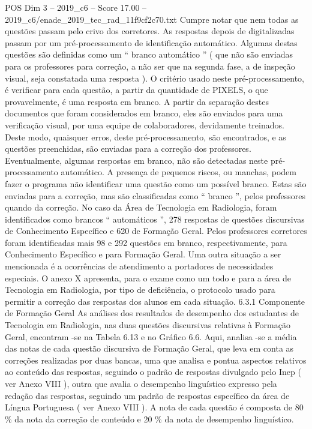 \begin{textsample}{POS Dim 3 – 2019\_c6 – Score 17.00 – 2019\_c6/enade\_2019\_tec\_rad\_11f9cf2c70.txt}
Cumpre notar que nem todas as questões passam pelo crivo dos corretores.
As respostas depois de digitalizadas passam por um pré-processamento de identificação automático.
Algumas destas questões são definidas como um “ branco automático ” ( que não são enviadas para os professores para correção, a não ser que na segunda fase, a de inspeção visual, seja constatada uma resposta ).
O critério usado neste pré-processamento, é verificar para cada questão, a partir da quantidade de PIXELS, o que provavelmente, é uma resposta em branco.
A partir da separação destes documentos que foram considerados em branco, eles são enviados para uma verificação visual, por uma equipe de colaboradores, devidamente treinados.
Deste modo, quaisquer erros, deste pré-processamento, são encontrados, e as questões preenchidas, são enviadas para a correção dos professores.
Eventualmente, algumas respostas em branco, não são detectadas neste pré-processamento automático.
A presença de pequenos riscos, ou manchas, podem fazer o programa não identificar uma questão como um possível branco.
Estas são enviadas para a correção, mas são classificadas como “ branco ”, pelos professores quando da correção.
No caso da Área de Tecnologia em Radiologia, foram identificados como brancos “ automáticos ”, 278 respostas de questões discursivas de Conhecimento Específico e 620 de Formação Geral.
Pelos professores corretores foram identificadas mais 98 e 292 questões em branco, respectivamente, para Conhecimento Específico e para Formação Geral.
Uma outra situação a ser mencionada é a ocorrências de atendimento a portadores de necessidades especiais.
O anexo X apresenta, para o exame como um todo e para a área de Tecnologia em Radiologia, por tipo de deficiência, o protocolo usado para permitir a correção das respostas dos alunos em cada situação. 6.3.1 Componente de Formação Geral As análises dos resultados de desempenho dos estudantes de Tecnologia em Radiologia, nas duas questões discursivas relativas à Formação Geral, encontram -se na Tabela 6.13 e no Gráfico 6.6.
Aqui, analisa -se a média das notas de cada questão discursiva de Formação Geral, que leva em conta as correções realizadas por duas bancas, uma que analisa e pontua aspectos relativos ao conteúdo das respostas, seguindo o padrão de respostas divulgado pelo Inep ( ver Anexo VIII ), outra que avalia o desempenho linguístico expresso pela redação das respostas, seguindo um padrão de respostas específico da área de Língua Portuguesa ( ver Anexo VIII ).
A nota de cada questão é composta de 80 \% da nota da correção de conteúdo e 20 \% da nota de desempenho linguístico.

\end{textsample}
